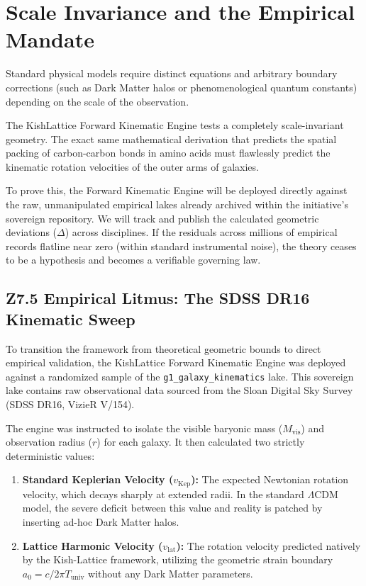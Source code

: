 \documentclass[11pt, letterpaper, openany]{book}
\begin{document}
\section{Scale Invariance and the Empirical Mandate}

Standard physical models require distinct equations and arbitrary boundary corrections (such as Dark Matter halos or phenomenological quantum constants) depending on the scale of the observation. 

The KishLattice Forward Kinematic Engine tests a completely scale-invariant geometry. The exact same mathematical derivation that predicts the spatial packing of carbon-carbon bonds in amino acids must flawlessly predict the kinematic rotation velocities of the outer arms of galaxies. 

To prove this, the Forward Kinematic Engine will be deployed directly against the raw, unmanipulated empirical lakes already archived within the initiative's sovereign repository. We will track and publish the calculated geometric deviations ($\Delta$) across disciplines. If the residuals across millions of empirical records flatline near zero (within standard instrumental noise), the theory ceases to be a hypothesis and becomes a verifiable governing law.


\subsection*{Z7.5 Empirical Litmus: The SDSS DR16 Kinematic Sweep}

To transition the framework from theoretical geometric bounds to direct empirical validation, the KishLattice Forward Kinematic Engine was deployed against a randomized sample of the \texttt{g1\_galaxy\_kinematics} lake. This sovereign lake contains raw observational data sourced from the Sloan Digital Sky Survey (SDSS DR16, VizieR V/154).

The engine was instructed to isolate the visible baryonic mass ($M_{\text{vis}}$) and observation radius ($r$) for each galaxy. It then calculated two strictly deterministic values:
\begin{enumerate}
    \item \textbf{Standard Keplerian Velocity ($v_{\text{Kep}}$):} The expected Newtonian rotation velocity, which decays sharply at extended radii. In the standard $\Lambda$CDM model, the severe deficit between this value and reality is patched by inserting ad-hoc Dark Matter halos.
    \item \textbf{Lattice Harmonic Velocity ($v_{\text{lat}}$):} The rotation velocity predicted natively by the Kish-Lattice framework, utilizing the geometric strain boundary $a_0 = c / 2\pi T_{\text{univ}}$ without any Dark Matter parameters.
\end{enumerate}
\end{document}
